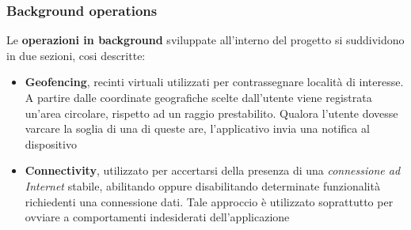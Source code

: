 \documentclass{article}
\begin{document}
\subsubsection*{Background operations}
Le \textbf{operazioni in background} sviluppate all'interno del progetto si suddividono in due sezioni, cosi descritte:
\begin{itemize}
    \renewcommand{\labelitemi}{-}
    \item \textbf{Geofencing}, recinti virtuali utilizzati per contrassegnare località di interesse. A partire dalle coordinate geografiche scelte dall'utente viene registrata un'area circolare, rispetto ad un raggio prestabilito. Qualora l'utente dovesse varcare la soglia di una di queste are, l'applicativo invia una notifica al dispositivo
    \item \textbf{Connectivity}, utilizzato per accertarsi della presenza di una \textit{connessione ad Internet} stabile, abilitando oppure disabilitando determinate funzionalità richiedenti una connessione dati. Tale approccio è utilizzato soprattutto per ovviare a comportamenti indesiderati dell'applicazione
\end{itemize}
\begin{center}
    \begin{figure}[H]
        \centering
    \end{figure}
\end{center}
\end{document}
